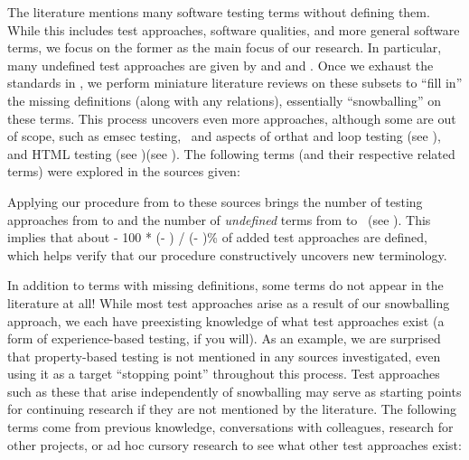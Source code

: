 The literature mentions many software testing terms without defining them.
While this includes test approaches, software qualities, and more general
software terms, we focus on the former as the main focus of our research.
In particular, many undefined test approaches are given by \ifnotpaper
    \citep{IEEE2022} and \citep{Firesmith2015}\else
    \cite{Firesmith2015} and \cite{IEEE2022}\fi. Once we exhaust the standards
in , we
perform miniature literature reviews on these subsets to ``fill in'' the
missing definitions (along with any relations), essentially ``snowballing''
on these terms. This process uncovers even more approaches, although some are
out of scope, such as \acf{emsec} testing\ifnotpaper, \else\ and \fi
aspects of \acf{orthat} \ifnotpaper and loop testing (see ),
    and HTML testing (see )\else (see )\fi. The
following terms (and their respective related terms) were explored in the
sources given:

Applying our procedure from  to these sources brings the number
of testing approaches from \the\TotalBefore{} to \the\TotalAfter{} and the
number of \emph{undefined} terms from \the\UndefBefore{} to \the\UndefAfter{}%
\ifnotpaper\ (see )\fi. This implies that about
\the{} - 100 * (\UndefAfter - \UndefBefore) / (\TotalAfter -
\TotalBefore)\relax\% of added test approaches are defined, which helps verify
that our procedure constructively uncovers new terminology.

\ifnotpaper
    
\fi

\label{missingTerms}
In addition to terms with missing definitions, some terms do not appear in
the literature at all! While most test approaches arise as a result of our
snowballing approach, we each have preexisting knowledge of what test
approaches exist (a form of experience-based testing, if you will).
As an example, we are surprised that property-based testing is not mentioned
in any sources investigated, even using it as a target ``stopping point''
throughout this process. Test approaches such as these that arise
independently of snowballing may serve as starting points for continuing
research if they are not mentioned by the literature. The following terms come
from previous knowledge, conversations with colleagues, research for other
projects, or ad hoc cursory research to see what other test approaches exist:
\newline

